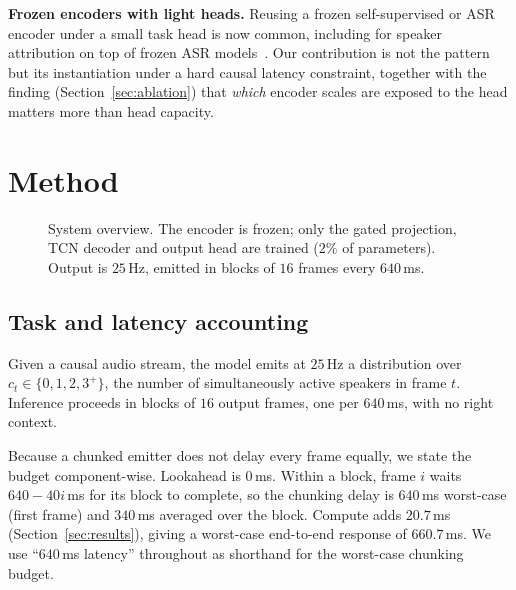 \documentclass[journal]{IEEEtran}
\begin{document}
\textbf{Frozen encoders with light heads.} Reusing a frozen self-supervised
or ASR encoder under a small task head is now common, including for speaker
attribution on top of frozen ASR models~\cite{msaasr2024}. Our contribution
is not the pattern but its instantiation under a hard causal latency
constraint, together with the finding (Section~\ref{sec:ablation}) that
\emph{which} encoder scales are exposed to the head matters more than head
capacity.

\section{Method}
\label{sec:method}

\begin{figure}[t]
\centering
{}
\caption{System overview. The encoder is frozen; only the gated projection,
TCN decoder and output head are trained ($2\%$ of parameters). Output is
$25$\,Hz, emitted in blocks of $16$ frames every $640$\,ms.}
\label{fig:arch}
\end{figure}

\subsection{Task and latency accounting}
Given a causal audio stream, the model emits at $25$\,Hz a distribution over
$c_t \in \{0,1,2,3^{+}\}$, the number of simultaneously active speakers in
frame $t$. Inference proceeds in blocks of $16$ output frames, one per
$640$\,ms, with no right context.

Because a chunked emitter does not delay every frame equally, we state the
budget component-wise. Lookahead is $0$\,ms. Within a block, frame $i$ waits
$640 - 40i$\,ms for its block to complete, so the chunking delay is
$640$\,ms worst-case (first frame) and $340$\,ms averaged over the block.
Compute adds $20.7$\,ms (Section~\ref{sec:results}), giving a worst-case
end-to-end response of $660.7$\,ms. We use ``$640$\,ms latency'' throughout
as shorthand for the worst-case chunking budget.
\end{document}

